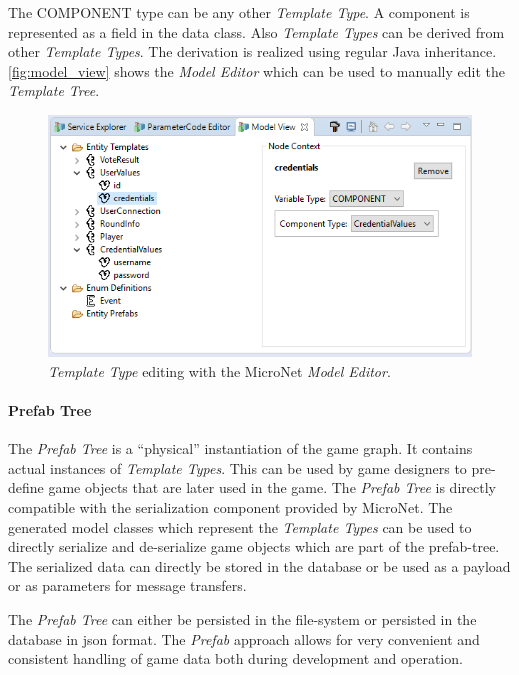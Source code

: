 The COMPONENT type can be any other \textit{Template Type}. A component is
represented as a field in the data class. Also \textit{Template Types} can be
derived from other \textit{Template Types}. The derivation is realized using
regular Java inheritance. \autoref{fig:model_view} shows the \textit{Model
Editor} which can be used to manually edit the \textit{Template Tree}.

\begin{figure}
	\centering
	\includegraphics[width=\textwidth]{images/tools/ModelView}
	\caption{\textit{Template Type} editing with the MicroNet \textit{Model Editor}.}
	\label{fig:model_view}
\end{figure}

\paragraph{Prefab Tree}

The \textit{Prefab Tree} is a ``physical'' instantiation of the game graph. It
contains actual instances of \textit{Template Types}. This can be used by game
designers to pre-define game objects that are later used in the game. The
\textit{Prefab Tree} is directly compatible with the serialization component
provided by MicroNet. The generated model classes which represent the
\textit{Template Types} can be used to directly serialize and de-serialize game
objects which are part of the prefab-tree. The serialized data can directly be
stored in the database or be used as a payload or as parameters for message
transfers.

The \textit{Prefab Tree} can either be persisted in the file-system or persisted in the
database in \gls{json} format. The \textit{Prefab} approach allows for very
convenient and consistent handling of game data both during development and
operation.

